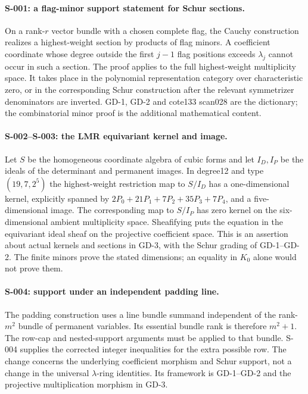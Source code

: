 \paragraph{S-001: a flag-minor support statement for Schur sections.}
On a rank-$r$ vector bundle with a chosen complete flag, the Cauchy
construction realizes a highest-weight section by products of flag
minors. A coefficient coordinate whose degree outside the first
$j-1$ flag positions exceeds $\lambda_j$ cannot occur in such a
section. The proof applies to the full highest-weight multiplicity
space. It takes place in the polynomial representation category over
characteristic zero, or in the corresponding Schur construction after
the relevant symmetrizer denominators are inverted. GD-1, GD-2 and
cote133 scan028 are the dictionary; the combinatorial minor proof is
the additional mathematical content.

\paragraph{S-002--S-003: the LMR equivariant kernel and image.}
Let $S$ be the homogeneous coordinate algebra of cubic forms and let
$I_D,I_P$ be the ideals of the determinant and permanent images.
In degree12 and type $(19,7,2^5)$ the highest-weight restriction map
to $S/I_D$ has a one-dimensional kernel, explicitly spanned by
$2P_0+21P_1+7P_2+35P_3+7P_4$, and a five-dimensional image.
The corresponding map to $S/I_P$ has zero kernel on the six-dimensional
ambient multiplicity space. Sheafifying puts the equation in the
equivariant ideal sheaf on the projective coefficient space. This is
an assertion about actual kernels and sections in GD-3, with the Schur
grading of GD-1--GD-2. The finite minors prove the stated dimensions;
an equality in $K_0$ alone would not prove them.

\paragraph{S-004: support under an independent padding line.}
The padding construction uses a line bundle summand independent of
the rank-$m^2$ bundle of permanent variables. Its essential bundle
rank is therefore $m^2+1$. The row-cap and nested-support arguments
must be applied to that bundle. S-004 supplies the corrected integer
inequalities for the extra possible row. The change concerns the
underlying coefficient morphism and Schur support, not a change in
the universal $\lambda$-ring identities. Its framework is GD-1--GD-2
and the projective multiplication morphism in GD-3.


